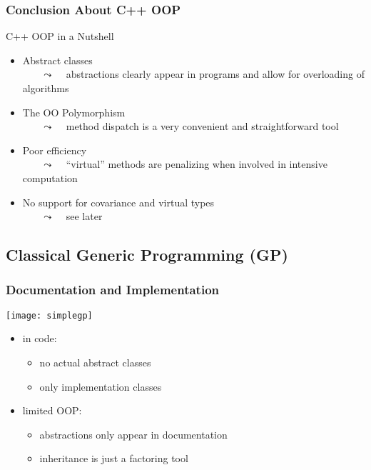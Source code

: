 \begin{frame}
  \frametitle{Conclusion About C++ OOP}


\begin{block}{C++ OOP in a Nutshell}
  \begin{itemize}
  \item[\bplus] Abstract classes \\
    ~~~ {\tiny{$\leadsto$ ~ abstractions clearly appear in programs and allow for overloading of algorithms}}
  \item[\bplus] The OO Polymorphism \\
    ~~~ {\tiny{$\leadsto$ ~ method dispatch is a very convenient and straightforward tool}}
  \item[\bminus] Poor efficiency \\
    ~~~ {\tiny{$\leadsto$ ~ ``virtual'' methods are penalizing when involved in intensive computation}}
  \item[\bminus] No support for covariance and virtual types \\
    ~~~ {\tiny{$\leadsto$ ~ see later}}
  \end{itemize}
\end{block}

\end{frame}




\subsection{Classical Generic Programming (GP)}


\begin{frame}[fragile]
  \frametitle{Documentation and Implementation}

\begin{multicols}{2}
%
  \begin{center}
    \texttt{[image: simplegp]}
  \end{center}
%
\columnbreak
%
{\scriptsize
\begin{itemize}
\item in code:
  \begin{itemize}
  \item no actual abstract classes
  \item only implementation classes
  \end{itemize}
  \smallskip
\item limited OOP:
  \begin{itemize}
  \item abstractions only appear in documentation
  \item inheritance is just a factoring tool
  \end{itemize}
\end{itemize}
}
%
\end{multicols}

\end{frame}



